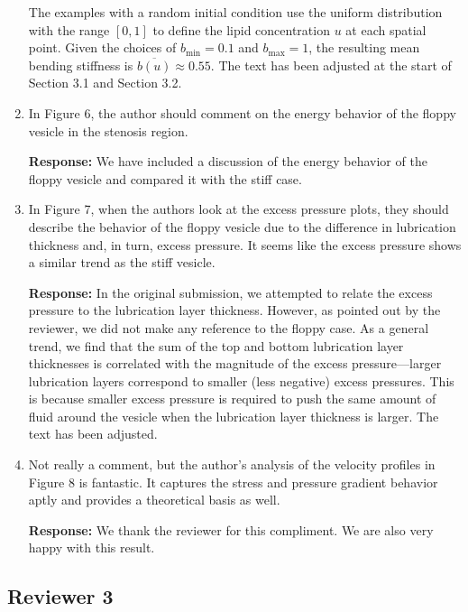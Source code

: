 \documentclass[11pt]{article}
\begin{document}
\begin{enumerate}
 The examples with a random initial condition
use the uniform distribution with the range $[0,1]$ to define the lipid
concentration $u$ at each spatial point. Given the choices of
$b_{\min}=0.1$ and $b_{\max}=1$, the resulting mean bending stiffness is
$\overline{b(u)} \approx 0.55$. The text has been adjusted at the start
of Section 3.1 and Section 3.2.

\item In Figure 6, the author should comment on the energy behavior of
  the floppy vesicle in the stenosis region.

\noindent
{\bf Response:} We have included a discussion of the energy behavior of
the floppy vesicle and compared it with the stiff case.

\item In Figure 7, when the authors look at the excess pressure plots,
  they should describe the behavior of the floppy vesicle due to the
  difference in lubrication thickness and, in turn, excess pressure. It
  seems like the excess pressure shows a similar trend as the stiff
  vesicle.

\noindent
{\bf Response:} In the original submission, we attempted to relate the
excess pressure to the lubrication layer thickness. However, as pointed
out by the reviewer, we did not make any reference to the floppy case.
As a general trend, we find that the sum of the top and bottom
lubrication layer thicknesses is correlated with the magnitude of the
excess pressure---larger lubrication layers correspond to smaller (less
negative) excess pressures. This is because smaller excess pressure is
required to push the same amount of fluid around the vesicle when the
lubrication layer thickness is larger. The text has been adjusted.


\item Not really a comment, but the author's analysis of the velocity
  profiles in Figure 8 is fantastic. It captures the stress and pressure
  gradient behavior aptly and provides a theoretical basis as well.

\noindent
{\bf Response:} We thank the reviewer for this compliment. We are also
very happy with this result. 


\end{enumerate}

\newpage

\subsection*{Reviewer 3}
\end{document}
